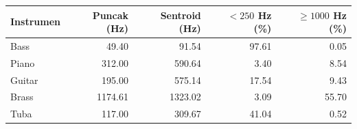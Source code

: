\begin{tabular}{lrrrr}
\toprule
Instrumen & Puncak (Hz) & Sentroid (Hz) & $<250$ Hz (\%) & $\geq1000$ Hz (\%) \\
\midrule
Bass & 49.40 & 91.54 & 97.61 & 0.05 \\
Piano & 312.00 & 590.64 & 3.40 & 8.54 \\
Guitar & 195.00 & 575.14 & 17.54 & 9.43 \\
Brass & 1174.61 & 1323.02 & 3.09 & 55.70 \\
Tuba & 117.00 & 309.67 & 41.04 & 0.52 \\
\bottomrule
\end{tabular}
